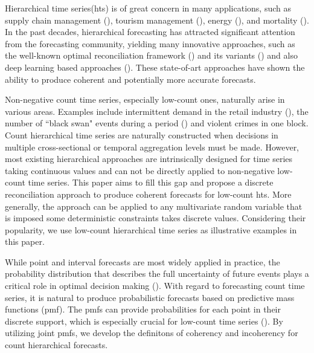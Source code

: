 \documentclass[a4paper,review,12pt,authoryear]{elsarticle}
\begin{document}
Hierarchical time series(hts) is of great concern in many applications, such as supply chain management (\citealp{babaiDemandForecastingSupply2022}), tourism management (\citealp{kourentzesCrosstemporalCoherentForecasts2019}), energy (\citealp{nystrupTemporalHierarchiesAutocorrelation2020}), and mortality (\citealp{liHierarchicalMortalityForecasting2022}).
In the past decades, hierarchical forecasting has attracted significant attention from the forecasting community, yielding many innovative approaches, such as the well-known optimal reconciliation framework (\citealp{hyndmanOptimalCombinationForecasts2011, wickramasuriyaOptimalForecastReconciliation2019, panagiotelisProbabilisticForecastReconciliation2022}) and its variants () and also deep learning based approaches (\citealp{rangapuramEndtoEndLearningCoherent2021}).
These state-of-art approaches have shown the ability to produce coherent and potentially more accurate forecasts.

Non-negative count time series, especially low-count ones, naturally arise in various areas. 
Examples include intermittent demand in the retail industry (\citealp{kourentzesElucidateStructureIntermittent2021}), the number of ``black swan" events during a period (\citealp{nikolopoulosWeNeedTalk2020}) and violent crimes in one block.
Count hierarchical time series are naturally constructed when decisions in multiple cross-sectional or temporal aggregation levels must be made.
However, most existing hierarchical approaches are intrinsically designed for time series taking continuous values and can not be directly applied to non-negative low-count time series. 
This paper aims to fill this gap and propose a discrete reconciliation approach to produce coherent forecasts for low-count hts. 
More generally, the approach can be applied to any multivariate random variable that is imposed some deterministic constraints takes discrete values.  
Considering their popularity, we use low-count hierarchical time series as illustrative examples in this paper.

While point and interval forecasts are most widely applied in practice, 
the probability distribution that describes the full uncertainty of future events plays a critical role in optimal decision making (\citealp{gneitingProbabilisticForecasting2014}).
With regard to forecasting count time series, it is natural to produce probabilistic forecasts based on predictive mass functions (pmf). 
The pmfs can provide probabilities for each point in their discrete support,
which is especially crucial for low-count time series (\citealp{petropoulosForecastingTheoryPractice2022a}).
By utilizing joint pmfs, we develop the definitons of coherency and incoherency for count hierarchical forecasts.
\end{document}
